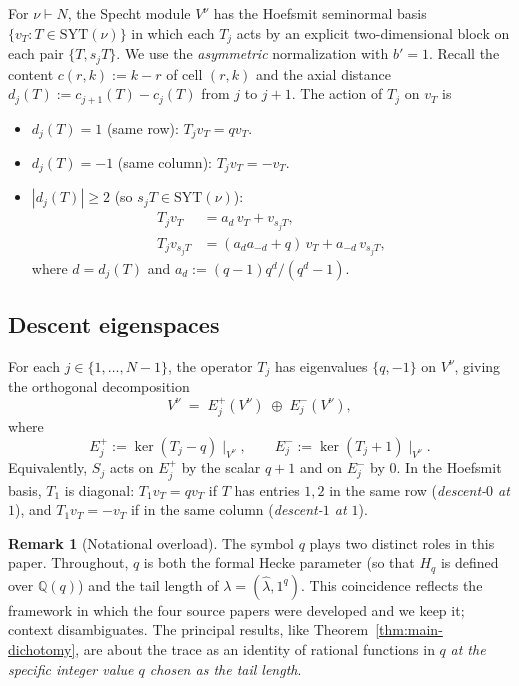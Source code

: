 \documentclass[11pt]{article}
\theoremstyle{definition}
\newtheorem{remark}[theorem]{Remark}
\newcommand{\Hq}{H_q}
\newcommand{\bla}{\widehat\lambda}
\newcommand{\SYT}{\mathrm{SYT}}
\newcommand{\Eplus}{E^{+}}
\newcommand{\Eminus}{E^{-}}
\begin{document}
For $\nu \vdash N$, the Specht module $V^\nu$ has the Hoefsmit seminormal basis $\{v_T : T \in \SYT(\nu)\}$ in which each $T_j$ acts by an explicit two-dimensional block on each pair $\{T, s_j T\}$.  We use the \emph{asymmetric} normalization with $b' = 1$.  Recall the content $c(r, k) := k - r$ of cell $(r,k)$ and the axial distance $d_j(T) := c_{j+1}(T) - c_j(T)$ from $j$ to $j+1$.  The action of $T_j$ on $v_T$ is
\begin{itemize}[topsep=2pt,itemsep=2pt]
\item[(a)] $d_j(T) = 1$ (same row): $T_j v_T = q v_T$.
\item[(b)] $d_j(T) = -1$ (same column): $T_j v_T = -v_T$.
\item[(c)] $|d_j(T)| \ge 2$ (so $s_j T \in \SYT(\nu)$):
\begin{align*}
   T_j v_T &= a_{d}\, v_T + v_{s_j T},\\
   T_j v_{s_j T} &= (a_d a_{-d} + q)\, v_T + a_{-d}\, v_{s_j T},
\end{align*}
where $d = d_j(T)$ and $a_d := (q-1) q^d/(q^d - 1)$.
\end{itemize}

\subsection{Descent eigenspaces}

For each $j \in \{1, \ldots, N-1\}$, the operator $T_j$ has eigenvalues $\{q, -1\}$ on $V^\nu$, giving the orthogonal decomposition
\[
   V^\nu \;=\; \Eplus_j(V^\nu) \;\oplus\; \Eminus_j(V^\nu),
\]
where
\[
   \Eplus_j := \ker(T_j - q)\!\mid_{V^\nu},
   \qquad
   \Eminus_j := \ker(T_j + 1)\!\mid_{V^\nu}.
\]
Equivalently, $S_j$ acts on $\Eplus_j$ by the scalar $q+1$ and on $\Eminus_j$ by $0$.  In the Hoefsmit basis, $T_1$ is diagonal: $T_1 v_T = q v_T$ if $T$ has entries $1, 2$ in the same row (\emph{descent-$0$ at $1$}), and $T_1 v_T = -v_T$ if in the same column (\emph{descent-$1$ at $1$}).

\begin{remark}[Notational overload]\label{rem:q-overload}
The symbol $q$ plays two distinct roles in this paper.  Throughout, $q$ is both the formal Hecke parameter (so that $\Hq$ is defined over $\mathbb{Q}(q)$) and the tail length of $\lambda = (\bla, 1^q)$.  This coincidence reflects the framework in which the four source papers were developed and we keep it; context disambiguates.  The principal results, like Theorem~\ref{thm:main-dichotomy}, are about the trace as an identity of rational functions in $q$ \emph{at the specific integer value $q$ chosen as the tail length}.
\end{remark}
\end{document}
